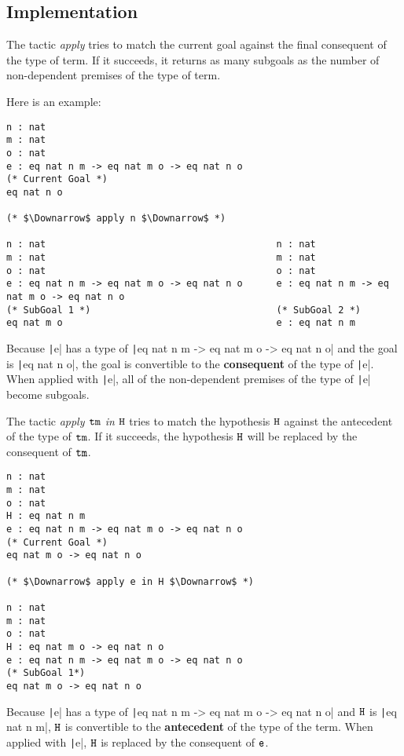 \subsection*{Implementation}
The tactic {\it apply} tries to match the current goal against the 
final consequent of the type of term. 
If it succeeds, it returns as many subgoals as 
the number of non-dependent premises of the type of term.\par
Here is an example:
\begin{center}
\begin{verbatim}
n : nat
m : nat
o : nat
e : eq nat n m -> eq nat m o -> eq nat n o                  
(* Current Goal *)      
eq nat n o                        

(* $\Downarrow$ apply n $\Downarrow$ *)   

n : nat                                         n : nat                                       
m : nat                                         m : nat                                   
o : nat                                         o : nat                                   
e : eq nat n m -> eq nat m o -> eq nat n o      e : eq nat n m -> eq nat m o -> eq nat n o       
(* SubGoal 1 *)                                 (* SubGoal 2 *)          
eq nat m o                                      e : eq nat n m
\end{verbatim}
\end{center}
Because \texttt|e| has a type of \texttt|eq nat n m -> eq nat m o -> eq nat n o| 
and the goal is \texttt|eq nat n o|,
the goal is convertible to the \textbf{consequent} of the type of \texttt|e|.
When applied with \texttt|e|,
all of the non-dependent premises of the type of \texttt|e| become subgoals.

The tactic {\it apply $\tt tm$ in $\tt H$} tries to match the hypothesis $\tt H$ against the 
antecedent of the type of $\tt tm$. 
If it succeeds, the hypothesis $\tt H$ will be replaced by the consequent of $\tt tm$.
\begin{center}
\begin{verbatim}
n : nat
m : nat
o : nat
H : eq nat n m 
e : eq nat n m -> eq nat m o -> eq nat n o                  
(* Current Goal *)      
eq nat m o -> eq nat n o                                        

(* $\Downarrow$ apply e in H $\Downarrow$ *)

n : nat                                                                         
m : nat                                                                     
o : nat  
H : eq nat m o -> eq nat n o
e : eq nat n m -> eq nat m o -> eq nat n o
(* SubGoal 1*)                                            
eq nat m o -> eq nat n o                                      
\end{verbatim}
\end{center}
Because \texttt|e| has a type of 
\texttt|eq nat n m -> eq nat m o -> eq nat n o| 
and $\tt H$ is \texttt|eq nat n m|,
$\tt H$ is convertible to the \textbf{antecedent} of the type of the term.
When applied with \texttt|e|,
$\tt H$ is replaced by the consequent of $\tt e$.

